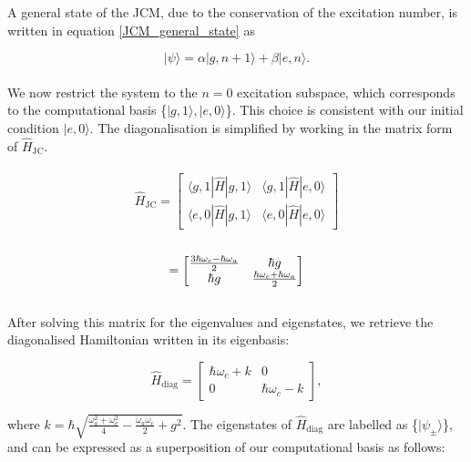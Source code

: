 \documentclass[12pt]{article}
\begin{document}
A general state of the JCM, due  to the conservation of the excitation number, is written in equation \eqref{JCM_general_state} as

\begin{equation*}
    |\psi\rangle = \alpha|g,n+1\rangle + \beta|e,n\rangle.
\end{equation*}
\\
We now restrict the system to the $n=0$ excitation subspace, which corresponds to the computational basis \small{\{$|g,1\rangle,|e,0\rangle$\}}. This choice is consistent with our initial condition $|e,0\rangle$. The diagonalisation is simplified by working in the matrix form of $\hat{H}_{\scriptscriptstyle \text{JC}}$.\\
\\
\begin{equation*}
    \hat{H}_{\scriptscriptstyle \text{JC}} = 
    \begin{bmatrix}
        \langle g,1|\hat{H}|g,1\rangle & \langle g,1|\hat{H}|e,0\rangle\\
        \langle e,0|\hat{H}|g,1\rangle & \langle e,0|\hat{H}|e,0\rangle
    \end{bmatrix}
\end{equation*}
\\
\begin{equation*}
=
    \begin{bmatrix}
        \frac{3\hbar\omega_c - \hbar\omega_a}{2} & \small{\hbar g} \\
        \small{\hbar g} & \frac{\hbar\omega_c + \hbar\omega_a}{2}
    \end{bmatrix}
\end{equation*}
\\
After solving this matrix for the eigenvalues and eigenstates, we retrieve the diagonalised Hamiltonian written in its eigenbasis:

\begin{equation*}
    \hat{H}_{\scriptscriptstyle \text{diag}} = 
    \begin{bmatrix}
        \hbar\omega_c + k & 0 \\
        0 & \hbar\omega_c - k
    \end{bmatrix},
\end{equation*}

where $k = \hbar\sqrt{\frac{\omega_a^2 + \omega_c^2}{4} - \frac{\omega_a\omega_c}{2} + g^2}$. The eigenstates of $\hat{H}_{\scriptscriptstyle \text{diag}}$ are labelled as \{$|\psi_\pm\rangle$\}, and can be expressed as a superposition of our computational basis as follows:
\end{document}
